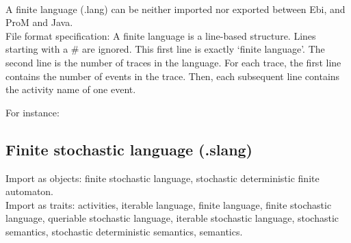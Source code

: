 {\\A finite language (.lang) can be neither imported nor exported between Ebi, and ProM and Java.
\\File format specification:
A finite language is a line-based structure. Lines starting with a \# are ignored.
    This first line is exactly `finite language'.
    The second line is the number of traces in the language.
    For each trace, the first line contains the number of events in the trace.
    Then, each subsequent line contains the activity name of one event.
    
    For instance:
    
\clearpage
\subsection{Finite stochastic language (.slang)}
\label{filehandler:finite stochastic language}
Import as objects: finite stochastic language, stochastic deterministic finite automaton.
\\Import as traits: activities, iterable language, finite language, finite stochastic language, queriable stochastic language, iterable stochastic language, stochastic semantics, stochastic deterministic semantics, semantics.
}
